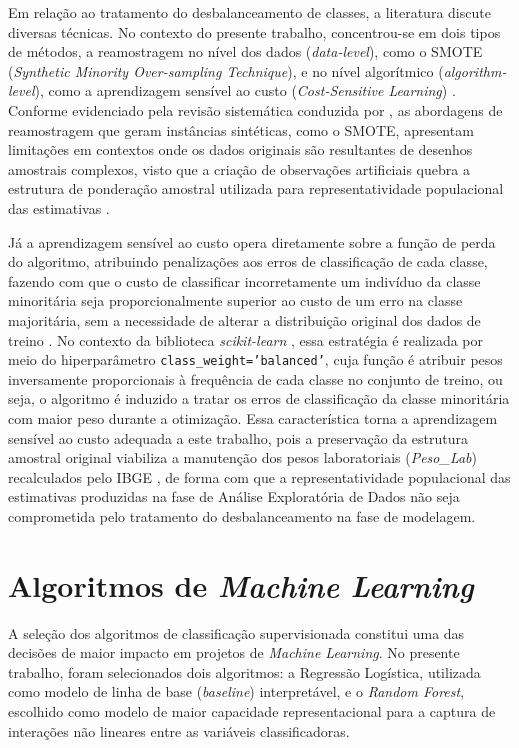 Em relação ao tratamento do desbalanceamento de classes, a literatura discute diversas técnicas. No contexto do presente trabalho, concentrou-se em dois tipos de métodos, a reamostragem no nível dos dados (\textit{data-level}), como o SMOTE (\textit{Synthetic Minority Over-sampling Technique}), e no nível algorítmico (\textit{algorithm-level}), como a aprendizagem sensível ao custo (\textit{Cost-Sensitive Learning}) \cite{araf2024costsensitive}. Conforme evidenciado pela revisão sistemática conduzida por \textcite{araf2024costsensitive}, as abordagens de reamostragem que geram instâncias sintéticas, como o SMOTE, apresentam limitações em contextos onde os dados originais são resultantes de desenhos amostrais complexos, visto que a criação de observações artificiais quebra a estrutura de ponderação amostral utilizada para representatividade populacional das estimativas \cite{10.1371/journal.pone.0280387}. 

Já a aprendizagem sensível ao custo opera diretamente sobre a função de perda do algoritmo, atribuindo penalizações aos erros de classificação de cada classe, fazendo com que o custo de classificar incorretamente um indivíduo da classe minoritária seja proporcionalmente superior ao custo de um erro na classe majoritária, sem a necessidade de alterar a distribuição original dos dados de treino \cite{araf2024costsensitive}. No contexto da biblioteca \textit{scikit-learn} \cite{pedregosa2011scikit}, essa estratégia é realizada por meio do hiperparâmetro \texttt{class\_weight='balanced'}, cuja função é atribuir pesos inversamente proporcionais à frequência de cada classe no conjunto de treino, ou seja, o algoritmo é induzido a tratar os erros de classificação da classe minoritária com maior peso durante a otimização. Essa característica torna a aprendizagem sensível ao custo adequada a este trabalho, pois a preservação da estrutura amostral original viabiliza a manutenção dos pesos laboratoriais (\textit{Peso\_Lab}) recalculados pelo IBGE \cite{IBGE}, de forma com que a representatividade populacional das estimativas produzidas na fase de Análise Exploratória de Dados não seja comprometida pelo tratamento do desbalanceamento na fase de modelagem.


\section{Algoritmos de \textit{Machine Learning}} \label{sec:algoritmos-ml}

A seleção dos algoritmos de classificação supervisionada constitui uma das decisões de maior impacto em projetos de \textit{Machine Learning}. No presente trabalho, foram selecionados dois algoritmos: a Regressão Logística, utilizada como modelo de linha de base (\textit{baseline}) interpretável, e o \textit{Random Forest}, escolhido como modelo de maior capacidade representacional para a captura de interações não lineares entre as variáveis classificadoras.

